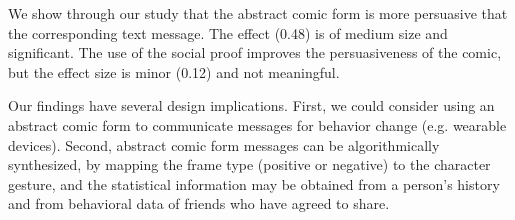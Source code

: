We show through our study that the abstract comic form is more persuasive that the corresponding text message. The effect (0.48) is of medium size and significant. The use of the social proof improves the persuasiveness of the comic, but the effect size is minor (0.12) and not meaningful.


Our findings have several design implications. First, we could consider using an abstract comic form to communicate messages for behavior change (e.g. wearable devices). Second, abstract comic form messages can be algorithmically synthesized, by mapping the frame type (positive or negative) to the character gesture, and the statistical information may be obtained from a person's history and from behavioral data of friends who have agreed to share.




